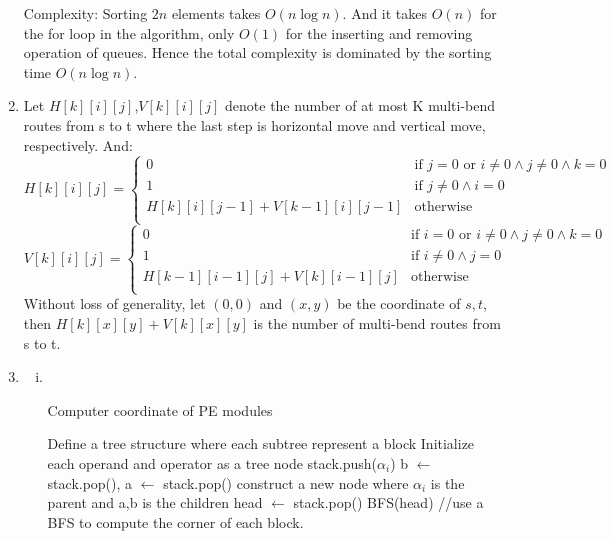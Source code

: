 \documentclass[a4paper,12pt]{article}
\begin{document}
\begin{enumerate}
Complexity: Sorting $2n$ elements takes $O(n\log n)$.
And it takes $O(n)$ for the for loop in the algorithm, only $O(1)$ for the inserting and removing operation of queues.
Hence the total complexity is dominated by the sorting time $O(n\log n)$.
\item
Let $H[k][i][j]$,$V[k][i][j]$ denote the number of at most K multi-bend routes
from s to t where the last step is horizontal move and vertical move, respectively. And:
\begin{equation}
H[k][i][j] = \left\{ \begin{array}{ll}
            0   &   \textrm{if $j=0$ or $i\neq0 \wedge j\neq0 \wedge k=0$}\\
            1   &   \textrm{if $j\neq 0 \wedge i=0 $}\\
            H[k][i][j-1] + V[k-1][i][j-1]&  \textrm{otherwise}\\
                    \end{array}\right.
\end{equation}
\begin{equation}
V[k][i][j] = \left\{ \begin{array}{ll}
            0   &   \textrm{if $i=0$ or $i\neq0 \wedge j\neq0 \wedge k=0$}\\
            1   &   \textrm{if $i\neq 0 \wedge j=0 $}\\
            H[k-1][i-1][j] + V[k][i-1][j] & \textrm{otherwise}\\
                    \end{array}\right.
\end{equation}
Without loss of generality, let $(0,0)$ and $(x,y)$ be the coordinate of $s,t$,
then $H[k][x][y]+V[k][x][y]$ is the number of multi-bend routes from s to t.
\item
\begin{enumerate}[(i)]
\item
~\\
\begin{algorithm}[htbp]
\caption{Computer coordinate of PE modules}
\begin{algorithmic}[1]
\STATE Define a tree structure where each subtree represent a block
\STATE Initialize each operand and operator as a tree node
        \STATE stack.push($\alpha_i$)
        \STATE b $\leftarrow$ stack.pop(), a $\leftarrow$ stack.pop()
        \STATE construct a new node where  $\alpha_i$ is the parent and a,b is the children
    \ENDIF
\ENDFOR
\STATE head $\leftarrow$ stack.pop()
\STATE BFS(head) //use a BFS to compute the corner of each block.
\end{algorithmic}
\end{algorithm}


\end{enumerate}
\end{enumerate}
\end{document}
